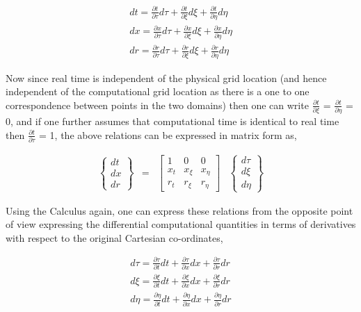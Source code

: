 \begin{displaymath}
	\begin{array}{c}
		dt=\frac{\partial t}{\partial \tau}d\tau + \frac{\partial t}{\partial \xi}d\xi +
		\frac{\partial t}{\partial \eta}d\eta \\
		dx=\frac{\partial x}{\partial \tau}d\tau + \frac{\partial x}{\partial \xi}d\xi +
		\frac{\partial x}{\partial \eta}d\eta \\
		dr=\frac{\partial r}{\partial \tau}d\tau + \frac{\partial r}{\partial \xi}d\xi +
		\frac{\partial r}{\partial \eta}d\eta
	\end{array}
\end{displaymath}

	Now since real time is independent of the physical grid location (and hence independent of the computational
grid location as there is a one to one correspondence between points in the two domains) then one can write 
$\frac{\partial t}{\partial \xi}$ = 
$\frac{\partial t}{\partial \eta}$ = 0, and if one further assumes that computational time is identical to
real time then $\frac{\partial t}{\partial \tau}$ = 1, the above relations can be expressed in matrix form
as,

\begin{equation}
	\begin{array}{cccc}
		\left\{
		\begin{array}{c}
		dt \\ dx \\ dr 
		\end{array} 
		\right\}
		& = &
		\left[
		\begin{array}{ccc}
		1 & 0 & 0 \\ x_{t} & x_{\xi} & x_{\eta} \\ r_{t} & r_{\xi} & r_{\eta} 
		\end{array}
		\right] 
		&
		\left\{
		\begin{array}{c}
		d\tau \\ d\xi \\ d\eta 
		\end{array}
		\right\}
	\end{array} 
\label{eqn:matrix1}
\end{equation}

	Using the Calculus again, one can express these relations from the opposite point of view 
expressing the differential computational quantities in terms of derivatives with respect to the 
original Cartesian co-ordinates,

\begin{displaymath}
	\begin{array}{c}
		d\tau=\frac{\partial \tau}{\partial t}dt + \frac{\partial \tau}{\partial x}dx +
		\frac{\partial \tau}{\partial r}dr \\
		d\xi=\frac{\partial \xi}{\partial t}dt + \frac{\partial \xi}{\partial x}dx +
		\frac{\partial \xi}{\partial r}dr \\
		d\eta=\frac{\partial \eta}{\partial t}dt + \frac{\partial \eta}{\partial x}dx +
		\frac{\partial \eta}{\partial r}dr
	\end{array}
\end{displaymath}


